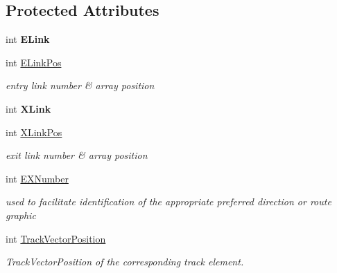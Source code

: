 \subsection*{Protected Attributes}
\begin{DoxyCompactItemize}
\item 
\mbox{\label{class_t_pref_dir_element_a7fee253f27bc8cabd8a45d4dcc40a5eb}} 
int {\bfseries E\+Link}
\item 
\mbox{\label{class_t_pref_dir_element_a6fc026102a01f722e0e13fdddce13ee0}} 
int \mbox{\hyperlink{class_t_pref_dir_element_a6fc026102a01f722e0e13fdddce13ee0}{E\+Link\+Pos}}
\begin{DoxyCompactList}\small\item\em entry link number \& array position \end{DoxyCompactList}\item 
\mbox{\label{class_t_pref_dir_element_a8650d58fb9ef3c94bf3f3ca6cc8f6f03}} 
int {\bfseries X\+Link}
\item 
\mbox{\label{class_t_pref_dir_element_aff497780d02596e181f762e55b4423c1}} 
int \mbox{\hyperlink{class_t_pref_dir_element_aff497780d02596e181f762e55b4423c1}{X\+Link\+Pos}}
\begin{DoxyCompactList}\small\item\em exit link number \& array position \end{DoxyCompactList}\item 
\mbox{\label{class_t_pref_dir_element_a1e631f79e44bdff2d5022349717c0592}} 
int \mbox{\hyperlink{class_t_pref_dir_element_a1e631f79e44bdff2d5022349717c0592}{E\+X\+Number}}
\begin{DoxyCompactList}\small\item\em used to facilitate identification of the appropriate preferred direction or route graphic \end{DoxyCompactList}\item 
\mbox{\label{class_t_pref_dir_element_a6b0e69b5e5b4143b9d2c5b0f5c091b64}} 
int \mbox{\hyperlink{class_t_pref_dir_element_a6b0e69b5e5b4143b9d2c5b0f5c091b64}{Track\+Vector\+Position}}
\begin{DoxyCompactList}\small\item\em Track\+Vector\+Position of the corresponding track element. \end{DoxyCompactList}\item 

\end{DoxyCompactItemize}
